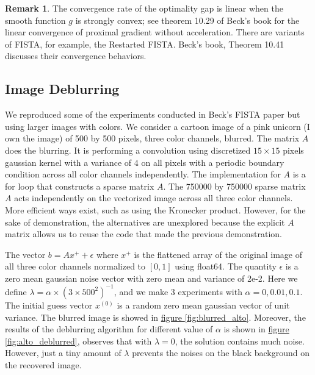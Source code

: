 \documentclass[]{article}
\theoremstyle{definition}
\newtheorem{remark}{Remark}[subsection]
{
    \newtheorem{assumption}{Assumption}
}
\begin{document}
        \begin{remark}
            The convergence rate of the optimality gap is linear when the smooth function $g$ is strongly convex; see theorem 10.29 of Beck's book\cite{book:first_order_opt} for the linear convergence of proximal gradient without acceleration. There are variants of FISTA, for example, the Restarted FISTA. Beck's book, Theorem 10.41 \cite{book:first_order_opt} discusses their convergence behaviors.
        \end{remark}
        
    \subsection*{Image Deblurring}
        We reproduced some of the experiments conducted in Beck's FISTA paper \cite{paper:FISTA} but using larger images with colors. We consider a cartoon image of a pink unicorn (I own the image) of 500 by 500 pixels, three color channels, blurred. The matrix $A$ does the blurring. It is performing a convolution using discretized $15\times 15$ pixels gaussian kernel with a variance of $4$ on all pixels with a periodic boundary condition across all color channels independently. The implementation for $A$ is a for loop that constructs a sparse matrix $A$. The 750000 by 750000 sparse matrix $A$ acts independently on the vectorized image across all three color channels. More efficient ways exist, such as using the Kronecker product. However, for the sake of demonstration, the alternatives are unexplored because the explicit $A$ matrix allows us to reuse the code that made the previous demonstration. 
        \par
        The vector $b = Ax^+ + \epsilon$ where $x^+$ is the flattened array of the original image of all three color channels normalized to $[0, 1]$ using float64. The quantity $\epsilon$ is a zero mean gaussian noise vector with zero mean and variance of 2e-2. Here we define $\lambda = \alpha\times (3\times500^2)^{-1}$, and we make 3 experiments with $\alpha = 0, 0.01, 0.1$. The initial guess vector $x^{(0)}$ is a random zero mean gaussian vector of unit variance. The blurred image is showed in \hyperref[fig:blurred_alto]{figure \ref*{fig:blurred_alto}}. Moreover, the results of the deblurring algorithm for different value of $\alpha$ is shown in \hyperref[fig:alto_deblurred]{figure \ref*{fig:alto_deblurred}}, observes that with $\lambda = 0$, the solution contains much noise. However, just a tiny amount of $\lambda$ prevents the noises on the black background on the recovered image. 
\end{document}
